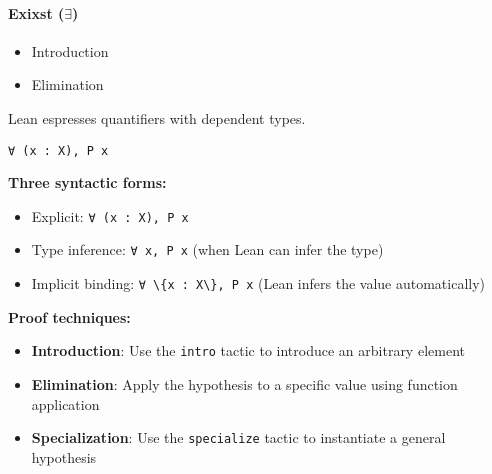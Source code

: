 \paragraph{Exixst ($\exists$)}
  \begin{itemize}
    \item Introduction
    \begin{prooftree}
    \end{prooftree}
    \item Elimination
    \begin{prooftree}
    \end{prooftree}
\end{itemize}
Lean espresses quantifiers with dependent types.

\begin{lstlisting}[language=Lean, caption=For All]
∀ (x : X), P x
\end{lstlisting}


\textbf{Three syntactic forms:}
\begin{itemize}
    \item Explicit: \lstinline[language=lean]|∀ (x : X), P x|
    \item Type inference: \lstinline[language=lean]|∀ x, P x| (when Lean can infer the type)
    \item Implicit binding: \lstinline[language=lean]|∀ \{x : X\}, P x| (Lean infers the value automatically)
\end{itemize}

\textbf{Proof techniques:}
\begin{itemize}
    \item \textbf{Introduction}: Use the \lstinline[language=lean]|intro| tactic to introduce an arbitrary element
    \item \textbf{Elimination}: Apply the hypothesis to a specific value using function application
    \item \textbf{Specialization}: Use the \lstinline[language=lean]|specialize| tactic to instantiate a general hypothesis
\end{itemize}



